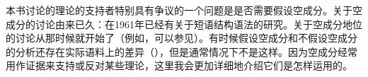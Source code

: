本书讨论的理论的支持者特别具有争议的一个问题是是否需要假设空成分。关于空成分的讨论由来已久：在1961年已经有关于短语结构语法的研究\citep*{BHPS61a}。关于空成分地位的讨论从那时候就开始了（例如，可以参见\citealp*{Loebner86a,Wunderlich87d,Wunderlich89,Stechow89,Haider97a,Sag2000a,BMS2001a,LH2006a,Mueller2004e,AS2015a}）。有时候假设空成分和不假设空成分的分析还存在实际语料上的差异（\citep{AS2015a}），但是通常情况下不是这样。因为空成分经常用作证据来支持或反对某些理论，这里我会更加详细地介绍它们是怎样运用的。

